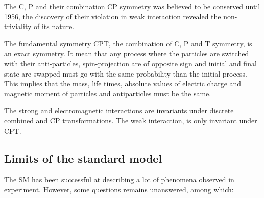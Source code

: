 The C, P and their combination CP symmetry was believed to be conserved until 1956, the discovery of their violation \cite{lee_question_1956, wu_experimental_1957, christenson_evidence_1964} in weak interaction revealed the non-triviality of its nature.

The fundamental symmetry CPT, the combination of C, P and T symmetry, is an exact symmetry. It mean that any process where the particles are switched with their anti-particles, spin-projection are of opposite sign and initial and final state are swapped must go with the same probability than the initial process. This implies that the mass, life times, absolute values of electric charge and magnetic moment of particles and antiparticles must be the same.

The strong and electromagnetic interactions are invariants under discrete combined and CP transformations. The weak interaction, is only invariant under CPT.


\subsection{Limits of the standard model}

The SM has been successful at describing a lot of phenomena observed in experiment. However, some questions remains unanswered, among which:

